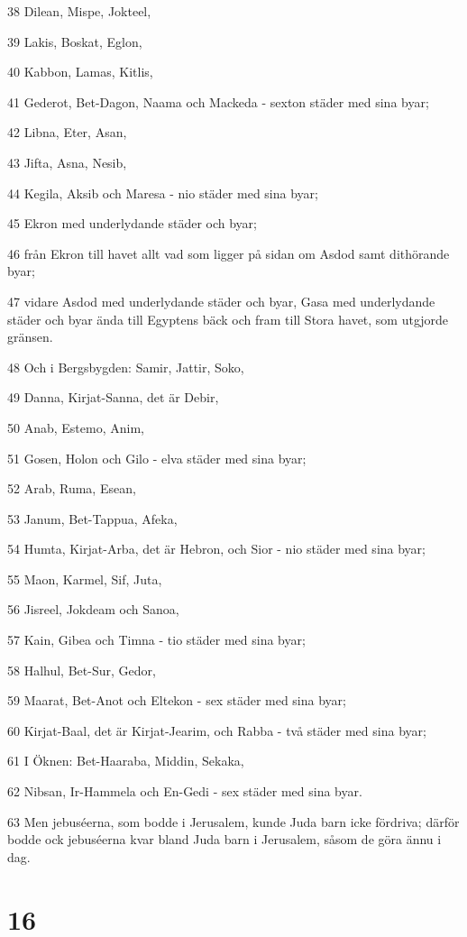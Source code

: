 \par 38 Dilean, Mispe, Jokteel,
\par 39 Lakis, Boskat, Eglon,
\par 40 Kabbon, Lamas, Kitlis,
\par 41 Gederot, Bet-Dagon, Naama och Mackeda - sexton städer med sina byar;
\par 42 Libna, Eter, Asan,
\par 43 Jifta, Asna, Nesib,
\par 44 Kegila, Aksib och Maresa - nio städer med sina byar;
\par 45 Ekron med underlydande städer och byar;
\par 46 från Ekron till havet allt vad som ligger på sidan om Asdod samt dithörande byar;
\par 47 vidare Asdod med underlydande städer och byar, Gasa med underlydande städer och byar ända till Egyptens bäck och fram till Stora havet, som utgjorde gränsen.
\par 48 Och i Bergsbygden: Samir, Jattir, Soko,
\par 49 Danna, Kirjat-Sanna, det är Debir,
\par 50 Anab, Estemo, Anim,
\par 51 Gosen, Holon och Gilo - elva städer med sina byar;
\par 52 Arab, Ruma, Esean,
\par 53 Janum, Bet-Tappua, Afeka,
\par 54 Humta, Kirjat-Arba, det är Hebron, och Sior - nio städer med sina byar;
\par 55 Maon, Karmel, Sif, Juta,
\par 56 Jisreel, Jokdeam och Sanoa,
\par 57 Kain, Gibea och Timna - tio städer med sina byar;
\par 58 Halhul, Bet-Sur, Gedor,
\par 59 Maarat, Bet-Anot och Eltekon - sex städer med sina byar;
\par 60 Kirjat-Baal, det är Kirjat-Jearim, och Rabba - två städer med sina byar;
\par 61 I Öknen: Bet-Haaraba, Middin, Sekaka,
\par 62 Nibsan, Ir-Hammela och En-Gedi - sex städer med sina byar.
\par 63 Men jebuséerna, som bodde i Jerusalem, kunde Juda barn icke fördriva; därför bodde ock jebuséerna kvar bland Juda barn i Jerusalem, såsom de göra ännu i dag.

\chapter{16}

